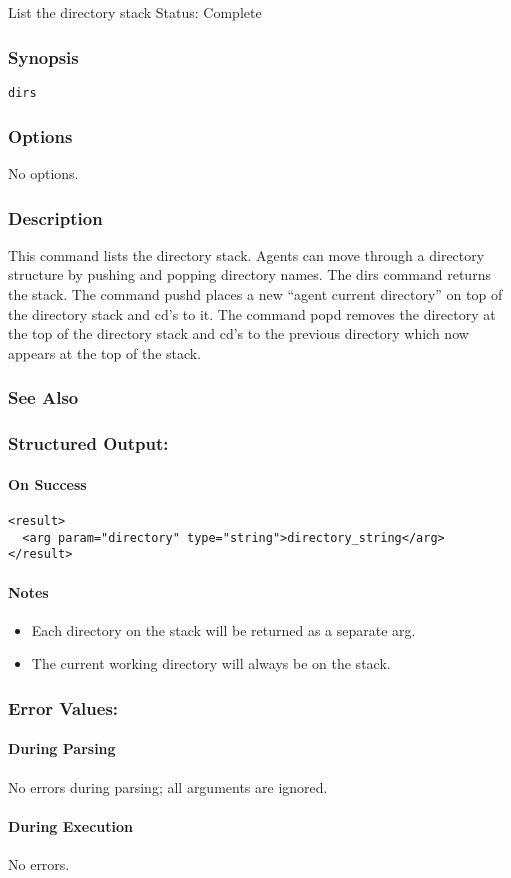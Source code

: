 \subsection{}
\label{dirs}
List the directory stack 
 Status: Complete
\subsubsection*{Synopsis}
\begin{verbatim}
dirs
\end{verbatim}
\subsubsection*{Options}
 No options. 
\subsubsection*{Description}
 This command lists the directory stack. Agents can move through a directory structure by pushing and popping directory names. The dirs command returns the stack. 
 The command pushd places a new ``agent current directory'' on top of the directory stack and cd's to it. The command popd removes the directory at the top of the directory stack and cd's to the previous directory which now appears at the top of the stack. 
\subsubsection*{See Also}
\subsubsection*{Structured Output:}
\paragraph*{On Success}
\begin{verbatim}
<result>
  <arg param="directory" type="string">directory_string</arg>
</result>
\end{verbatim}
\paragraph*{Notes}
\begin{itemize}
\item  Each directory on the stack will be returned as a separate arg. 
\item  The current working directory will always be on the stack. 
\end{itemize}
\subsubsection*{Error Values:}
\paragraph*{During Parsing}
 No errors during parsing; all arguments are ignored. 
\paragraph*{During Execution}
 No errors. 
